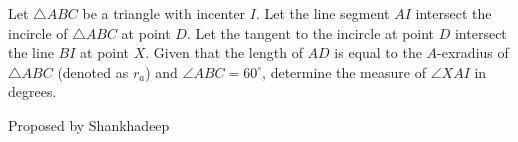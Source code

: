 Let \(\triangle ABC\) be a triangle with incenter \(I\). Let the line segment \(AI\) intersect the incircle of \(\triangle ABC\) at point \(D\). Let the tangent to the incircle at point \(D\) intersect the line \(BI\) at point \(X\). Given that the length of \(AD\) is equal to the \(A\)-exradius of \(\triangle ABC\) (denoted as \(r_a\)) and \(\angle ABC = 60^\circ\), determine the measure of \(\angle XAI\) in degrees.



Proposed by Shankhadeep
